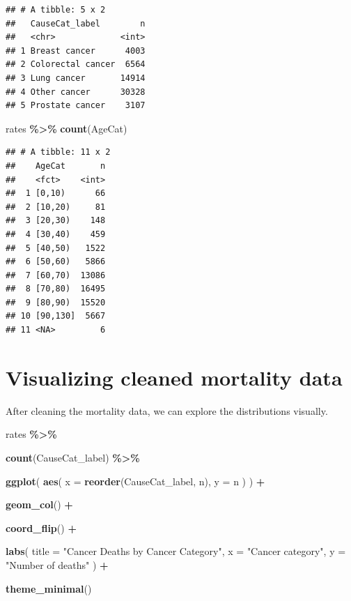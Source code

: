 \documentclass[
  11pt,
  oneside]{book}
\newenvironment{Shaded}{\begin{snugshade}}{\end{snugshade}}
\newcommand{\AttributeTok}[1]{\textcolor[rgb]{0.13,0.29,0.53}{#1}}
\newcommand{\FunctionTok}[1]{\textcolor[rgb]{0.13,0.29,0.53}{\textbf{#1}}}
\newcommand{\NormalTok}[1]{#1}
\newcommand{\SpecialCharTok}[1]{\textcolor[rgb]{0.81,0.36,0.00}{\textbf{#1}}}
\newcommand{\StringTok}[1]{\textcolor[rgb]{0.31,0.60,0.02}{#1}}
\begin{document}
\begin{verbatim}
## # A tibble: 5 x 2
##   CauseCat_label        n
##   <chr>             <int>
## 1 Breast cancer      4003
## 2 Colorectal cancer  6564
## 3 Lung cancer       14914
## 4 Other cancer      30328
## 5 Prostate cancer    3107
\end{verbatim}

\begin{Shaded}
\begin{Highlighting}[]
\NormalTok{rates }\SpecialCharTok{\%\textgreater{}\%}
  \FunctionTok{count}\NormalTok{(AgeCat)}
\end{Highlighting}
\end{Shaded}

\begin{verbatim}
## # A tibble: 11 x 2
##    AgeCat       n
##    <fct>    <int>
##  1 [0,10)      66
##  2 [10,20)     81
##  3 [20,30)    148
##  4 [30,40)    459
##  5 [40,50)   1522
##  6 [50,60)   5866
##  7 [60,70)  13086
##  8 [70,80)  16495
##  9 [80,90)  15520
## 10 [90,130]  5667
## 11 <NA>         6
\end{verbatim}

\section{Visualizing cleaned mortality data}\label{visualizing-cleaned-mortality-data}

After cleaning the mortality data, we can explore the distributions visually.

\begin{Shaded}
\begin{Highlighting}[]
\NormalTok{rates }\SpecialCharTok{\%\textgreater{}\%}
  
  \FunctionTok{count}\NormalTok{(CauseCat\_label) }\SpecialCharTok{\%\textgreater{}\%}
  
  \FunctionTok{ggplot}\NormalTok{(}
    \FunctionTok{aes}\NormalTok{(}
      \AttributeTok{x =} \FunctionTok{reorder}\NormalTok{(CauseCat\_label, n),}
      \AttributeTok{y =}\NormalTok{ n}
\NormalTok{    )}
\NormalTok{  ) }\SpecialCharTok{+}
  
  \FunctionTok{geom\_col}\NormalTok{() }\SpecialCharTok{+}
  
  \FunctionTok{coord\_flip}\NormalTok{() }\SpecialCharTok{+}
  
  \FunctionTok{labs}\NormalTok{(}
    \AttributeTok{title =} \StringTok{"Cancer Deaths by Cancer Category"}\NormalTok{,}
    \AttributeTok{x =} \StringTok{"Cancer category"}\NormalTok{,}
    \AttributeTok{y =} \StringTok{"Number of deaths"}
\NormalTok{  ) }\SpecialCharTok{+}
  
  \FunctionTok{theme\_minimal}\NormalTok{()}
\end{Highlighting}
\end{Shaded}
\end{document}
